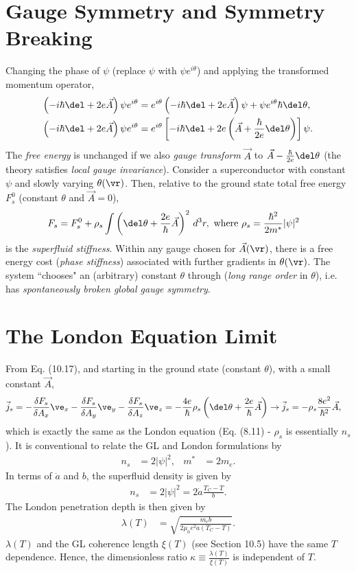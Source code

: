 \documentclass[qo.tex]{subfiles}
\begin{document}
\section{Gauge Symmetry and Symmetry Breaking}
Changing the phase of $\psi$ (replace $\psi$ with $\psi e^{i\theta}$) and applying the transformed momentum operator,
\begin{align}
    \left(-i\hbar\del+2e\vec{A}\right)\psi e^{i\theta} &= e^{i\theta}\left(-i\hbar\del+2e\vec{A}\right)\psi + \psi e^{i\theta}\hbar\del\theta,\\
    \left(-i\hbar\del+2e\vec{A}\right)\psi e^{i\theta} &= e^{i\theta}\left[-i\hbar\del+2e\left(\vec{A}+\frac{\hbar}{2e}\del\theta\right)\right]\psi.
\end{align}
The \emph{free energy} is unchanged if we also \emph{gauge transform} $\vec{A}$ to $\vec{A}-\frac{\hbar}{2e}\del\theta$ (the theory satisfies \emph{local gauge invariance}).
Consider a superconductor with constant $\psi$ and slowly varying $\theta(\vr)$.
Then, relative to the ground state total free energy $F_s^0$ (constant $\theta$ and $\vec{A}=0$),
\begin{align}
    F_s &= F_s^0 + \rho_s\int\left(\del\theta+\frac{2e}{\hbar}\vec{A}\right)^2\,d^3r, \text{ where } \rho_s = \frac{\hbar^2}{2m^*}|\psi|^2
\end{align}
is the \emph{superfluid stiffness}.
Within any gauge chosen for $\vec{A}(\vr)$, there is a free energy cost (\emph{phase stiffness}) associated with further gradients in $\theta(\vr)$.
The system ``chooses" an (arbitrary) constant $\theta$ through (\emph{long range order} in $\theta$), i.e. has \emph{spontaneously broken global gauge symmetry}.

\section{The London Equation Limit}
From Eq. (10.17), and starting in the ground state (constant $\theta$), with a small constant $\vec{A}$,
\begin{align}
    \vec{j}_s &= -\frac{\delta F_s}{\delta A_x}\ve_x - \frac{\delta F_s}{\delta A_y}\ve_y - \frac{\delta F_s}{\delta A_z}\ve_z = -\frac{4e}{\hbar}\rho_s\left(\del\theta+\frac{2e}{\hbar}\vec{A}\right) \to \vec{j}_s = -\rho_s\frac{8e^2}{\hbar^2}\vec{A},
\end{align}
which is exactly the same as the London equation (Eq. (8.11) - $\rho_s$ is essentially $n_s$).
It is conventional to relate the GL and London formulations by
\begin{align}
    n_s &= 2|\psi|^2, & m^* &= 2m_e.
\end{align}
In terms of $\dot{a}$ and $b$, the superfluid density is given by 
\begin{align}
    n_s &= 2|\psi|^2 = 2\dot{a}\frac{T_C-T}{b}.
\end{align}
The London penetration depth is then given by
\begin{align}
    \lambda(T) &= \sqrt{\frac{m_eb}{2\mu_0e^2\dot{a}(T_C-T)}}.
\end{align}
$\lambda(T)$ and the GL coherence length $\xi(T)$ (see Section 10.5) have the same $T$ dependence.
Hence, the dimensionless ratio $\kappa \equiv \frac{\lambda(T)}{\xi(T)}$ is independent of $T$.
\end{document}
